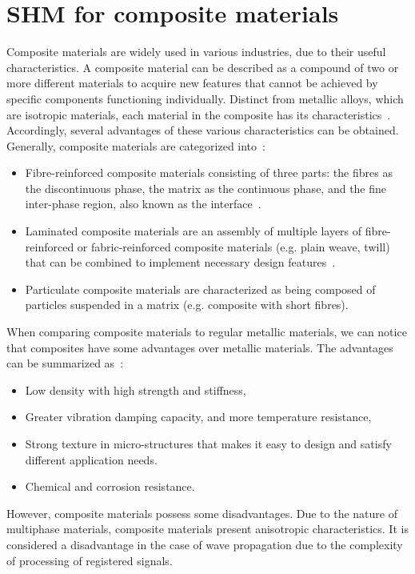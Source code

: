\section[SHM for composite materials]{SHM for composite materials}
\label{sec21}
Composite materials are widely used in various industries, due to their useful characteristics. 
A composite material can be described as a compound of two or more different materials to acquire new features that cannot be achieved by specific components functioning individually.
Distinct from metallic alloys, which are isotropic materials, each material in the composite has its characteristics~\cite{Campbell2010}.
Accordingly, several advantages of these various characteristics can be obtained. 
Generally, composite materials are categorized into~\cite{Jones1999}:
\begin{itemize}
	\item Fibre-reinforced composite materials consisting of three parts: the fibres as the discontinuous phase, the matrix as the continuous phase, and the fine inter-phase region, also known as the interface~\cite{Cantwell1991}.
	\item Laminated composite materials are an assembly of multiple layers of fibre-reinforced or fabric-reinforced composite materials (e.g. plain weave, twill) that can be combined to implement necessary design features~\cite{Ramirez1999}.
	\item Particulate composite materials are characterized as being composed of particles suspended in a matrix (e.g. composite with short fibres).
\end{itemize}

When comparing composite materials to regular metallic materials, we can notice that composites have some advantages over metallic materials. 
The advantages can be summarized as~\cite{Campbell2010}:
\begin{itemize}
	\item Low density with high strength and stiffness,
	\item Greater vibration damping capacity, and more temperature resistance,
	\item Strong texture in micro-structures that makes it easy to design and 
	satisfy different application needs. 
	\item Chemical and corrosion resistance.	
\end{itemize}

However, composite materials possess some disadvantages.
Due to the nature of multiphase materials, composite materials present anisotropic characteristics. 
It is considered a disadvantage in the case of wave propagation due to the complexity of processing of registered signals. 

